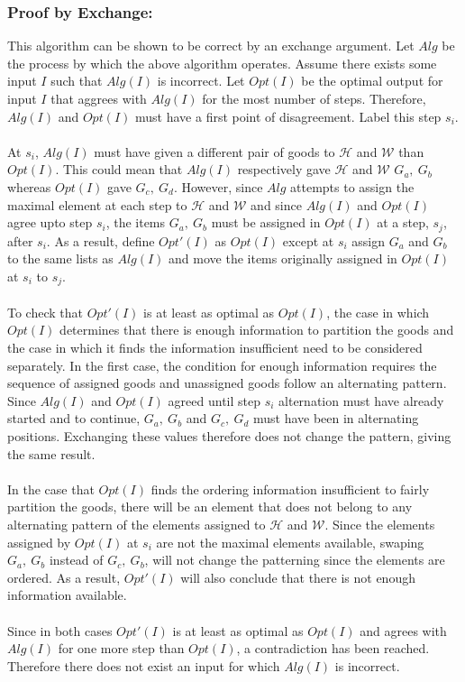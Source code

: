 \documentclass[12pt]{article}
\begin{document}
\subsubsection*{Proof by Exchange:}
This algorithm can be shown to be correct by an exchange argument.
Let $Alg$ be the process by which the above algorithm operates.
Assume there exists some input $I$ such that $Alg(I)$ is incorrect.
Let $Opt(I)$ be the optimal output for input $I$ that aggrees with
$Alg(I)$ for the most number of steps.  Therefore, $Alg(I)$ and $Opt(I)$
must have a first point of disagreement.  Label this step $s_i$.\\\\
At $s_i$, $Alg(I)$ must have given a different pair of goods to
$\mathcal{H}$ and $\mathcal{W}$ than $Opt(I)$.  This could mean that
$Alg(I)$ respectively gave $\mathcal{H}$ and $\mathcal{W}$ $G_a,\ G_b$      
whereas $Opt(I)$ gave $G_c,\ G_d$.  However, since $Alg$ attempts
to assign the maximal element at each step to $\mathcal{H}$ and 
$\mathcal{W}$ and since $Alg(I)$ and $Opt(I)$ agree upto 
step $s_i$, the items $G_a,\ G_b$ must be assigned in $Opt(I)$
at a step, $s_j$, after $s_i$.  As a result, define $Opt'(I)$
as $Opt(I)$ except at $s_i$ assign $G_a$ and $G_b$ to the
same lists as $Alg(I)$ and move the items originally assigned
in $Opt(I)$ at $s_i$ to $s_j$.\\\\
To check that $Opt'(I)$ is at least as optimal as $Opt(I)$,
the case in which $Opt(I)$ determines that there is enough
information to partition the goods and the case in which it
finds the information insufficient need to be considered 
separately.  In the first case, the condition for enough
information requires the sequence of assigned goods and
unassigned goods follow an alternating pattern.  Since 
$Alg(I)$ and $Opt(I)$ agreed until step $s_i$ alternation
must have already started and to continue, $G_a,\ G_b$ and 
$G_c,\ G_d$ must have been in alternating positions.  Exchanging
these values therefore does not change the pattern, giving
the same result.\\\\    
In the case that $Opt(I)$ finds the ordering information
insufficient to fairly partition the goods, there will be
an element that does not belong to any alternating pattern 
of the elements assigned to $\mathcal{H}$
and $\mathcal{W}$.  Since the elements assigned by $Opt(I)$ at
$s_i$ are not the maximal elements available, swaping $G_a,\ G_b$
instead of $G_c,\ G_b$, will not change the patterning since
the elements are ordered.  As a result, $Opt'(I)$ will also
conclude that there is not enough information available.\\\\
Since in both cases $Opt'(I)$ is at least as optimal as $Opt(I)$
and agrees with $Alg(I)$ for one more step than $Opt(I)$, a 
contradiction has been reached.  Therefore there does not exist 
an input for which $Alg(I)$ is incorrect.   
\end{document}

